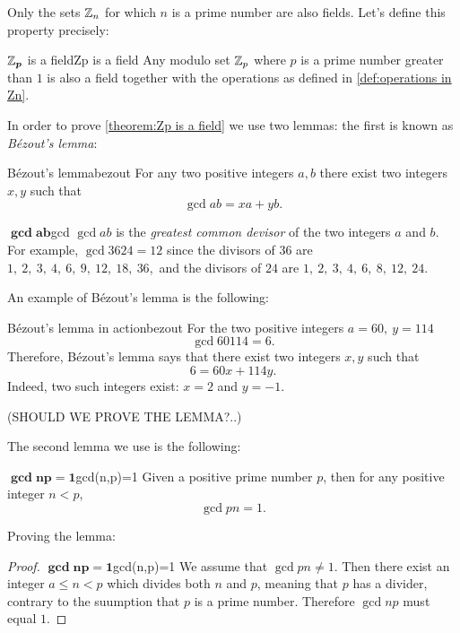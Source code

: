 Only the sets $\mathbb{Z}_{n}$ for which $n$ is a prime number are also fields. Let's define this property precisely:

\begin{theorem}{$\bm{\mathbb{Z}_{p}}$ is a field}{Zp is a field}
	Any modulo set $\mathbb{Z}_{p}$ where $p$ is a prime number greater than $1$ is also a field together with the operations as defined in \autoref{def:operations in Zn}.
\end{theorem}

In order to prove \autoref{theorem:Zp is a field} we use two lemmas: the first is known as \emph{B\'ezout’s lemma}:
\begin{lemma}{B\'ezout's lemma}{bezout}
	For any two positive integers $a,b$ there exist two integers $x,y$ such that
	\[
		\gcd{a}{b} = xa+yb.
	\]
\end{lemma}

\begin{note}{$\bm{\gcd{a}{b}}$}{gcd}
	$\gcd{a}{b}$ is the \emph{greatest common devisor} of the two integers $a$ and $b$. For example, $\gcd{36}{24}=12$ since the divisors of $36$ are $1,\ 2,\ 3,\ 4,\ 6,\ 9,\ 12,\ 18,\ 36$,\ and the divisors of $24$ are $1,\ 2,\ 3,\ 4,\ 6,\ 8,\ 12,\ 24$.
\end{note}

An example of B\'ezout's lemma is the following:

\begin{example}{B\'ezout's lemma in action}{bezout}
	For the two positive integers $a=60,\ y=114$
	\[
		\gcd{60}{114}=6.
	\]
	Therefore, B\'ezout's lemma says that there exist two integers $x,y$ such that
	\[
		6 = 60x + 114y.
	\]
	Indeed, two such integers exist: $x=2$ and $y=-1$.
\end{example}
(SHOULD WE PROVE THE LEMMA?..)

The second lemma we use is the following:
\begin{lemma}{$\bm{\gcd{n}{p}=1}$}{gcd(n,p)=1}
	Given a positive prime number $p$, then for any positive integer $n<p$,
	\[
		\gcd{p}{n}=1.
	\]
\end{lemma}

Proving the lemma:
\begin{proof}{$\bm{\gcd{n}{p}=1}$}{gcd(n,p)=1}
	We assume that $\gcd{p}{n} \neq 1$. Then there exist an integer $a\leq n<p$ which divides both $n$ and $p$, meaning that $p$ has a divider, contrary to the suumption that $p$ is a prime number. Therefore $\gcd{n}{p}$ must equal $1$.
\end{proof}

